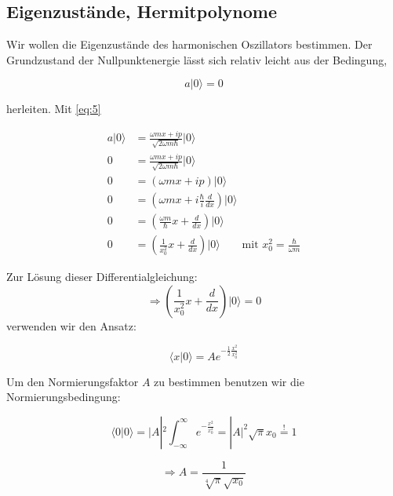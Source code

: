 \subsection*{Eigenzustände, Hermitpolynome}

Wir wollen die Eigenzustände des harmonischen Oszillators bestimmen. Der Grundzustand der Nullpunktenergie lässt sich relativ leicht aus der Bedingung,

\begin{equation}
  \label{eq:32}
  a |0 \rangle  = 0
\end{equation}

herleiten. Mit \eqref{eq:5}

\begin{align}
  \label{eq:33}
  a|0\rangle  &= \frac{\omega m x+ip}{\sqrt{2\omega m\hbar}}|0\rangle  \\
 0 &= \frac{\omega m x+ip}{\sqrt{2\omega m\hbar}}|0\rangle  \\
 0 &= \left(\omega m x+ip\right)|0\rangle  \\
 0 &= \left(\omega m x+i \frac{\hbar}{i} \frac{d}{dx}\right)|0\rangle  \\
 0 &= \left( \frac{\omega m}{\hbar} x+ \frac{d}{dx}\right)|0\rangle  \\
 0 &= \left( \frac{1}{x^2_0} x+ \frac{d}{dx}\right)|0\rangle \qquad \text{mit } x_0^2 = \frac{\hbar}{\omega m} 
\end{align}

Zur Lösung dieser Differentialgleichung:
\begin{equation}
  \label{eq:34}
 \Rightarrow  \left( \frac{1}{x^2_0} x+ \frac{d}{dx}\right)|0\rangle = 0
\end{equation}
verwenden wir den Ansatz:

\begin{equation}
  \label{eq:35}
  \langle x |0\rangle = A e^{-\frac{1}{2}\frac{x^2}{x_0^2}}
\end{equation}

Um den Normierungsfaktor \(A\) zu bestimmen benutzen wir die Normierungsbedingung:

\begin{equation}
  \label{eq:36}
\langle 0|0\rangle  = |A|^2 \int_{-\infty}^{\infty} e^{-\frac{x^2}{x_0^2}} = |A|^2 \sqrt{\pi}x_0 \stackrel{!}= 1
\end{equation}

\begin{equation}
  \label{eq:37}
  \Rightarrow A = \frac{1}{\sqrt[4]{\pi}\sqrt{x_0}}
\end{equation}

